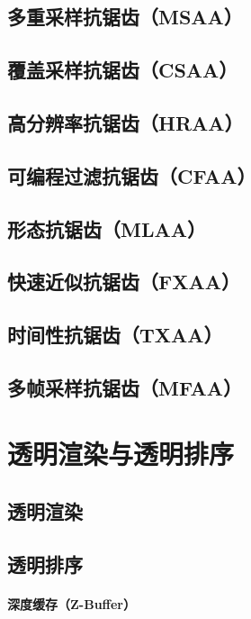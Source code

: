 \documentclass[UTF8,a4paper,12pt]{ctexbook}
\begin{document}
		\subsection{多重采样抗锯齿（MSAA）}
		
		\subsection{覆盖采样抗锯齿（CSAA）}
		
		\subsection{高分辨率抗锯齿（HRAA）}
		
		\subsection{可编程过滤抗锯齿（CFAA）}
		
		\subsection{形态抗锯齿（MLAA）}
		
		\subsection{快速近似抗锯齿（FXAA）}
		
		\subsection{时间性抗锯齿（TXAA）}
		
		\subsection{多帧采样抗锯齿（MFAA）}
		
	\section{透明渲染与透明排序}
		\subsection{透明渲染}
		
		\subsection{透明排序}
			\paragraph{深度缓存（Z-Buffer）}
			
\end{document}
